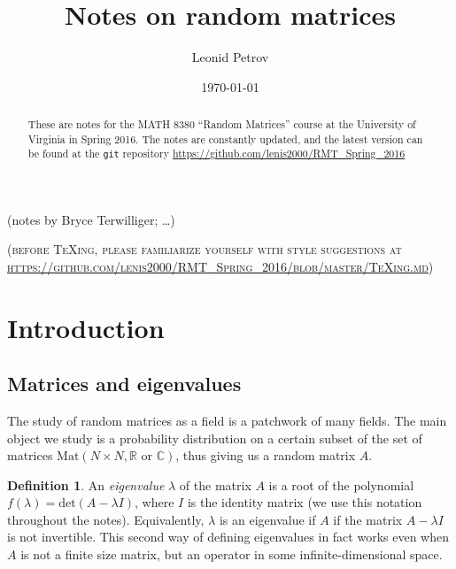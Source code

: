 \documentclass[letterpaper,11pt,oneside,reqno]{amsart}
\numberwithin{equation}{section}
\newcommand{\note}[1]{\textsc{\color{blue}(#1)}}
\newcounter{lecture}
\newcommand{\lect}[1]{\medskip\addtocounter{lecture}{1}\noindent{\Large\textbf{\color{red}Lecture \#\arabic{lecture} on #1 \hrulefill}}\medskip}
\theoremstyle{definition}
\newtheorem{definition}[proposition]{Definition}
\begin{document}
\title[Notes on random matrices]{Notes on random matrices}

\author[L. Petrov]{Leonid Petrov}
\date{\today}
\maketitle

\begin{center}
	(notes by Bryce Terwilliger; \ldots)
\end{center}

\begin{abstract}
	These are notes for the MATH 8380 ``Random Matrices'' course at the
	University of Virginia in Spring 2016. The notes are constantly updated,
	and the latest version can be found at the \texttt{git} repository
	\url{https://github.com/lenis2000/RMT_Spring_2016}
\end{abstract}

\bigskip

\begin{center}
\noindent\note{before \TeX{}ing, please familiarize yourself with style suggestions at\\
\url{https://github.com/lenis2000/RMT_Spring_2016/blob/master/TeXing.md}}
\end{center}
\bigskip

\setcounter{tocdepth}{1}
\tableofcontents
\setcounter{tocdepth}{3}

\lect{1/20/2016}

\section{Introduction} %
\label{sec:introduction}

\subsection{Matrices and eigenvalues} %
\label{sub:object_of_study}

The study of random matrices as a field is a patchwork of many fields.  The
main object we study is a probability distribution on a certain subset of the
set of matrices $\mathrm{Mat}(N\times N,\mathbb R \text{ or } \mathbb C)$,
thus giving us a random matrix $A$.

\begin{definition}
An {\it eigenvalue} $\lambda$ of the matrix $A$ is a root of the polynomial
$f(\lambda)=\text{det}(A-\lambda I)$, where $I$ is the identity matrix 
(we use this notation throughout the notes).  
Equivalently, $\lambda$ is an
eigenvalue if $A$ if the matrix $A-\lambda I$ is not invertible. This second
way of defining eigenvalues in fact works even when $A$ is not a finite
size matrix, but an operator in some infinite-dimensional space.
\end{definition}
\end{document}

